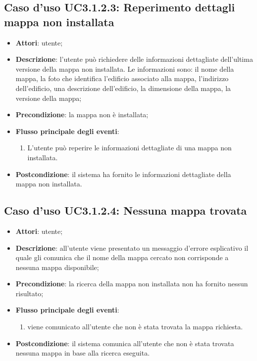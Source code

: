 \documentclass[../AnalisiDeiRequisiti.tex]{subfiles}
\begin{document}
\subsection{Caso d'uso UC3.1.2.3: Reperimento dettagli mappa non installata}
\begin{itemize}
	\item \textbf{Attori}: utente;
	\item \textbf{Descrizione}: l'utente può richiedere delle informazioni dettagliate dell'ultima versione della mappa non installata. Le informazioni sono: il nome della mappa, la foto che identifica l'edificio associato alla mappa, l'indirizzo dell'edificio, una descrizione dell'edificio, la dimensione della mappa, la versione della mappa; 
	\item \textbf{Precondizione}: la mappa non è installata;
	
	\item \textbf{Flusso principale degli eventi}:
	\begin{enumerate}
		\item L'utente può reperire le informazioni dettagliate di una mappa non installata.
		
	\end{enumerate}
	\item \textbf{Postcondizione}: il sistema ha fornito le informazioni dettagliate della mappa non installata.
\end{itemize}
\hypertarget{UC3.1.2.4}{}
\subsection{Caso d'uso UC3.1.2.4: Nessuna mappa trovata}
\begin{itemize}
	\item \textbf{Attori}: utente;
	\item \textbf{Descrizione}: all'utente viene presentato un messaggio d'errore esplicativo il quale gli comunica che il nome della mappa cercato non corrisponde a nessuna mappa disponibile; 
	\item \textbf{Precondizione}: la ricerca della mappa non installata non ha fornito nessun risultato;
	
	\item \textbf{Flusso principale degli eventi}:
	\begin{enumerate}
		\item viene comunicato all'utente che non è stata trovata la mappa richiesta.
		
	\end{enumerate}
	\item \textbf{Postcondizione}: il sistema comunica all'utente che non è stata trovata nessuna mappa in base alla ricerca eseguita.
\end{itemize}
\hypertarget{UC3.2}{}
\end{document}
